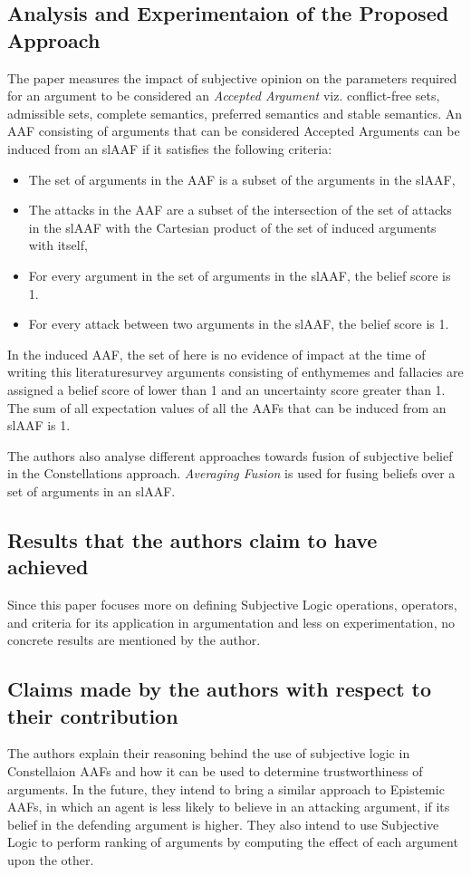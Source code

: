 \documentclass[UTF8]{article}
\begin{document}
\subsection{Analysis and Experimentaion of the Proposed Approach}
The paper measures the impact of subjective opinion on the parameters required for an argument to be considered an \textit{Accepted Argument} viz. conflict-free sets, admissible sets, complete semantics, preferred semantics
and stable semantics. An AAF consisting of arguments that can be considered Accepted Arguments can be induced from an slAAF if it satisfies the 
following criteria:
\begin{itemize}
  \item The set of arguments in the AAF is a subset of the arguments in the slAAF,
  \item The attacks in the AAF are a subset of the intersection of the set of attacks in the slAAF with the Cartesian product of the set of induced arguments with itself,
  \item For every argument in the set of arguments in the slAAF, the belief score is 1.
  \item For every attack between two arguments in the slAAF, the belief score is 1.
\end{itemize}
In the induced AAF, the set of here is no evidence of impact at the time of writing this literaturesurvey
arguments consisting of enthymemes and fallacies are assigned a belief score of lower than 1 and an uncertainty score greater than 1. The sum of all expectation values of all the AAFs that can be induced from an slAAF is 1.

The authors also analyse different approaches towards fusion of subjective belief in the Constellations approach. \textit{Averaging Fusion} is used for fusing beliefs over a set of arguments in an slAAF.

\subsection{Results that the authors claim to have achieved}
Since this paper focuses more on defining Subjective Logic operations, operators, and criteria for its application in argumentation and less on experimentation, no concrete results are mentioned by the author.

\subsection{Claims made by the authors with respect to their contribution}
The authors explain their reasoning behind the use of subjective logic in Constellaion AAFs and how it can be used to determine trustworthiness
of arguments. In the future, they intend to bring a similar approach to Epistemic AAFs, in which an agent is less likely to believe in an attacking argument, 
if its belief in the defending argument is higher. They also intend to use Subjective Logic to perform ranking of arguments by 
computing the effect of each argument upon the other.
\end{document}
